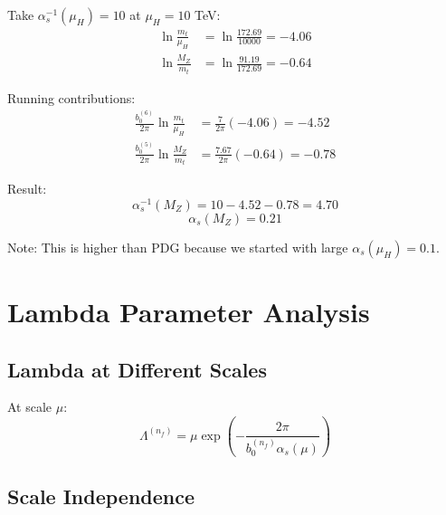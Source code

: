 \documentclass[11pt,a4paper]{article}
\theoremstyle{definition}
\begin{document}
\begin{quarantinebox}
Take $\alpha_s^{-1}(\mu_H) = 10$ at $\mu_H = 10$ TeV:
\begin{align}
\label{eq:num-run-1}
\ln\frac{m_t}{\mu_H} &= \ln\frac{172.69}{10000} = -4.06 \\
\label{eq:num-run-2}
\ln\frac{M_Z}{m_t} &= \ln\frac{91.19}{172.69} = -0.64
\end{align}

Running contributions:
\begin{align}
\label{eq:num-contrib-1}
\frac{b_0^{(6)}}{2\pi}\ln\frac{m_t}{\mu_H} &= \frac{7}{2\pi}(-4.06) = -4.52 \\
\label{eq:num-contrib-2}
\frac{b_0^{(5)}}{2\pi}\ln\frac{M_Z}{m_t} &= \frac{7.67}{2\pi}(-0.64) = -0.78
\end{align}

Result:
\begin{equation}
\label{eq:num-result}
\alpha_s^{-1}(M_Z) = 10 - 4.52 - 0.78 = 4.70
\end{equation}
\begin{equation}
\label{eq:num-alpha-mz}
\alpha_s(M_Z) = 0.21
\end{equation}

Note: This is higher than PDG because we started with large $\alpha_s(\mu_H) = 0.1$.
\end{quarantinebox}

\section{Lambda Parameter Analysis}
\label{app:lambda-analysis}

\subsection{Lambda at Different Scales}
\label{subsec:lambda-scales}

At scale $\mu$:
\begin{equation}
\label{eq:lambda-at-mu}
\Lambda^{(n_f)} = \mu \exp\left(-\frac{2\pi}{b_0^{(n_f)}\alpha_s(\mu)}\right)
\end{equation}

\subsection{Scale Independence}
\label{subsec:scale-indep}
\end{document}
